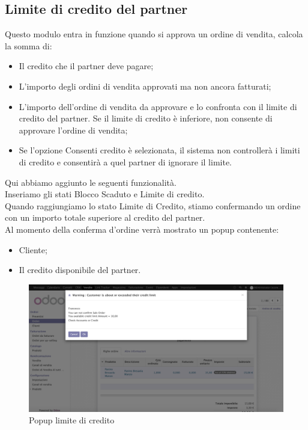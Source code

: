 \subsection{Limite di credito del partner}
Questo modulo entra in funzione quando si approva un ordine di vendita, calcola la somma di:
\begin{itemize}
\item Il credito che il partner deve pagare;
\item L'importo degli ordini di vendita approvati ma non ancora fatturati;
\item L'importo dell'ordine di vendita da approvare e lo confronta con il limite di credito del partner. Se il limite di credito è inferiore, non consente di approvare l'ordine di vendita;
\item Se l'opzione Consenti credito è selezionata, il sistema non controllerà i limiti di credito e consentirà a quel partner di ignorare il limite.
\end{itemize}
\vspace*{0.5cm}
Qui abbiamo aggiunto le seguenti funzionalità.\\
Inseriamo gli stati Blocco Scaduto e Limite di credito.\\
Quando raggiungiamo lo stato Limite di Credito, stiamo confermando un ordine con un importo totale superiore al credito del partner.\\
Al momento della conferma d'ordine verrà mostrato un popup contenente:
\begin{itemize}
	\item Cliente;
	\item Il credito disponibile del partner.
\end{itemize}
\newpage
\begin{figure}[H]
	\begin{center} \includegraphics[scale=0.3]{figures/check_limit}
		\caption[Popup limite di credito]{Popup limite di credito}
		\label{fig:check_limit}
	\end{center}
\end{figure}

